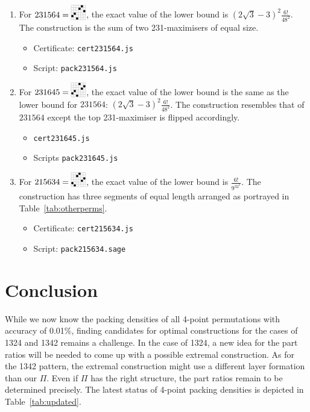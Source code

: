 \documentclass[12pt, a4paper, twoside]{report}
\begin{document}
\begin{enumerate}
\begin{itemize}
  \end{itemize}
\item For $231564 = \bcaobca$, the exact value of the lower bound is $(2\sqrt{3}-3)^2\frac{6!}{48^2}$. The construction is the sum of two 231-maximisers of equal size.
  \begin{itemize}
  \item Certificate: \texttt{cert231564.js}
  \item Script: \texttt{pack231564.js}
  \end{itemize}
\item For $231645 = \bcaocab$, the exact value of the lower bound is the same as the lower bound for $231564$: $(2\sqrt{3}-3)^2\frac{6!}{48^2}$. The construction resembles that of $231564$ except the top 231-maximiser is flipped accordingly.
  \begin{itemize}
  \item \texttt{cert231645.js}
  \item Scripts \texttt{pack231645.js}
  \end{itemize}
\item For $215634 = \baoabmab$, the exact value of the lower bound is $\frac{6!}{9^32^3}$. The construction has three segments of equal length arranged as portrayed in Table~\ref{tab:otherperms}.
  \begin{itemize}
  \item Certificate: \texttt{cert215634.js}
  \item Script: \texttt{pack215634.sage}
  \end{itemize}
\end{enumerate}

\section{Conclusion}

While we now know the packing densities of all 4-point permutations with accuracy of 0.01\%, finding candidates for optimal constructions for the cases of 1324 and 1342 remains a challenge. In the case of 1324, a new idea for the part ratios will be needed to come up with a possible extremal construction. As for the 1342 pattern, the extremal construction might use a different layer formation than our $\Pi$. Even if $\Pi$ has the right structure, the part ratios remain to be determined precisely. The latest status of 4-point packing densities is depicted in Table~\ref{tab:updated}.
\end{document}
